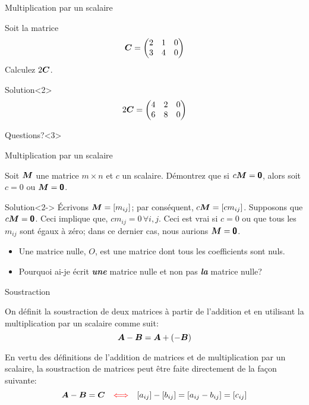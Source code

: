 \documentclass[french, handout]{beamer}
\begin{document}
\begin{frame}{Multiplication par un scalaire}
\begin{example}
    Soit la matrice \[
    \boldsymbol{C} = \begin{pmatrix}
        2 & 1 & 0\\
        3 & 4 & 0
        \end{pmatrix}
    \]
    Calculez $2\boldsymbol{C}$.
\end{example}
\begin{block}{Solution}<2>
\[
    2\boldsymbol{C} = \begin{pmatrix}
        4 & 2 & 0\\
        6 & 8 & 0
        \end{pmatrix}
    \]
    \end{block}
\begin{block}{Questions?}<3>
\end{block}   
\end{frame}

\begin{frame}{Multiplication par un scalaire}
\begin{example}
	Soit $\boldsymbol{M}$ une matrice $m\times n$ et $c$ un scalaire.  Démontrez que si $c\boldsymbol{M} = \mbox{\textsf{\textbf{{0}}}}$, alors
	soit $c=0$ ou $\boldsymbol{M}=\mbox{\textsf{\textbf{{0}}}}$.
\end{example}
\begin{block}{Solution}<2->
	Écrivons $\boldsymbol{M}=[m_{ij}]$; par conséquent, $c\boldsymbol{M} = [cm_{ij}]$.  Supposons que $c\boldsymbol{M} = \mbox{\textsf{\textbf{{0}}}}$.  Ceci implique que,
	$ cm_{ij}=0\,\forall i, j $.  Ceci est vrai si $c=0$ ou que tous les $m_{ij}$ sont égaux à zéro; dans ce dernier
	cas, nous aurions $\boldsymbol{M}=\mbox{\textsf{\textbf{{0}}}}$.
\end{block}
\begin{itemize}
\item<3-> Une matrice nulle, $O$, est une matrice dont tous les coefficients sont nuls.
\item<4> \alert{Pourquoi ai-je écrit \textit{\textbf{une}} matrice nulle et non pas \textit{\textbf{la}} matrice nulle?}
\end{itemize}
\end{frame}

\begin{frame}{Soustraction}
\begin{definition}
On définit la soustraction de deux matrices
à partir de l'addition et en utilisant la multiplication par un scalaire comme suit:
\[
\boldsymbol{A}-\boldsymbol{B} = \boldsymbol{A} + (-\boldsymbol{B})
\]
\end{definition}

En vertu des définitions de l'addition de matrices et de multiplication par un scalaire, la
soustraction de matrices peut être faite directement de la façon suivante:
\[
\boldsymbol{A} - \boldsymbol{B} = \boldsymbol{C} \quad {\color{red}\Longleftrightarrow} \quad [a_{ij}] - [b_{ij}] = [a_{ij} - b_{ij}] = [c_{ij}]
\]
\end{frame}
\end{document}
